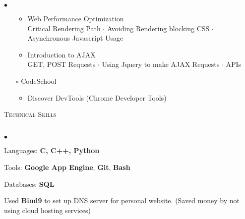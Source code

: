 \documentclass{article}
\newcommand{\lineunder}{\vspace*{-8pt} \\ \hspace*{-18pt} \hrulefill \\}
\newcommand{\header}[1]{{\hspace*{-15pt}\vspace*{6pt} \textsc{#1}} \vspace*{-6pt} \lineunder}
\newenvironment{achievements}{\begin{list}{$\bullet$}{\topsep 0pt \itemsep -1.5pt \leftmargin 5pt}}{\vspace*{4pt}\end{list}}
\begin{document}
\begin{achievements}
\begin{itemize}
\begin{itemize}
	\vspace{-2pt}
	\item Web Performance Optimization
	\\ Critical Rendering Path $\cdot$ Avoiding Rendering blocking CSS $\cdot$ Asynchronous Javascript Usage
	\vspace{-2pt}
	\item Introduction to AJAX
	\\ GET, POST Requests $\cdot$ Using Jquery to make AJAX Requests $\cdot$ APIs
	\end{itemize}
	\vspace{-3.5pt}
\item[$\circ$] CodeSchool
	\begin{itemize}
	\vspace{-2pt}
	\item Discover DevTools (Chrome Developer Tools)
	\end{itemize}
	\end{itemize}
\end{achievements}

\header{Technical Skills}
\begin{achievements}
\item Languages: \textbf{C, C++, Python}
\item Tools: \textbf{Google App Engine}, \textbf{Git}, \textbf{Bash}
\item Databases: \textbf{SQL}
\item Used \textbf{Bind9} to set up DNS server for personal website. (Saved money by not using cloud hosting services)
\end{achievements}

\vspace{7pt}
\end{document}
